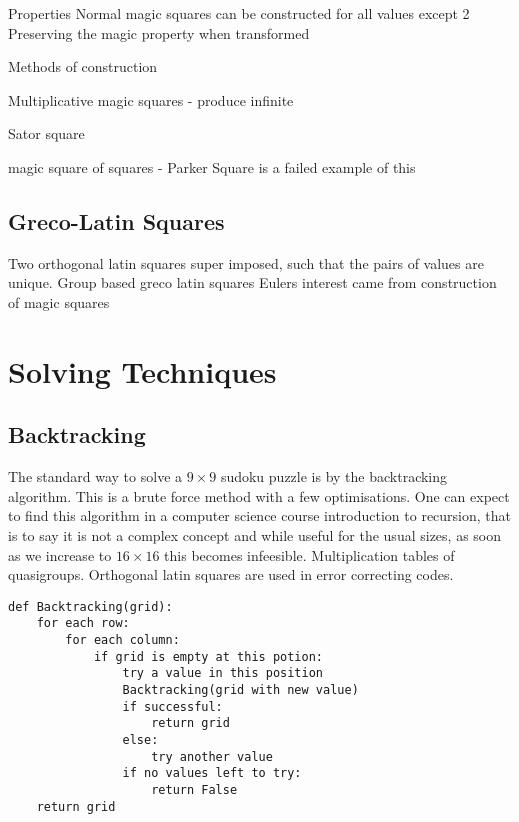 \documentclass[a4paper,12pt]{article}
\begin{document}
		Properties
			Normal magic squares can be constructed for all values except 2
			Preserving the magic property when transformed

		Methods of construction

		Multiplicative magic squares - produce infinite

		Sator square

		magic square of squares - Parker Square is a failed example of this
	
	\subsection{Greco-Latin Squares}

		Two orthogonal latin squares super imposed, such that the pairs of values are unique.
		Group based greco latin squares
		Eulers interest came from construction of magic squares
		

\section{Solving Techniques}
	\subsection{Backtracking}
		
		The standard way to solve a $9 \times 9$ sudoku puzzle is by the backtracking algorithm. 
		This is a brute force method with a few optimisations.
		One can expect to find this algorithm in a computer science course introduction to recursion, that is to say it is not a complex concept 
		and while useful for the usual sizes, as soon as we increase to $16 \times 16$ this becomes infeesible.
		Multiplication tables of quasigroups.
		Orthogonal latin squares are used in error correcting codes.
		
		\begin{lstlisting}[caption=Backtracking]
def Backtracking(grid):
    for each row:
        for each column:
            if grid is empty at this potion:
                try a value in this position
                Backtracking(grid with new value)
                if successful:
                    return grid
                else:
                    try another value
                if no values left to try:
                    return False
    return grid						
		\end{lstlisting}
		
\end{document}
